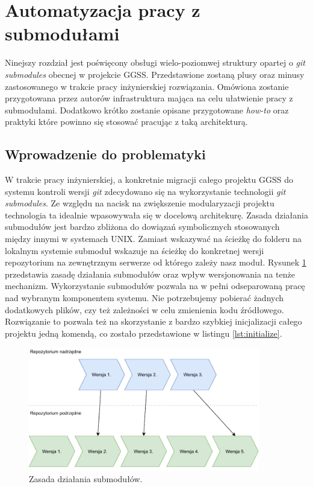 \clearpage
\section{Automatyzacja pracy z submodułami}
\label{sec:gitio}

Ninejszy rozdział jest poświęcony obsługi wielo-poziomwej struktury opartej o \emph{git submodules} obecnej w projekcie GGSS. Przedstawione zostaną plusy oraz minusy zastosowanego w trakcie pracy inżynierskiej rozwiązania. Omówiona zostanie przygotowana przez autorów infrastruktura mająca na celu ułatwienie pracy z submodułami. Dodatkowo krótko zostanie opisane przygotowane \emph{how-to} oraz praktyki które powinno się stosować pracując z taką architekturą.

\subsection{Wprowadzenie do problematyki}

W trakcie pracy inżynierskiej, a konkretnie migracji całego projektu GGSS do systemu kontroli wersji \emph{git} zdecydowano się na wykorzystanie technologii \emph{git submodules}. Ze względu na nacisk na zwiększenie modularyzacji projektu technologia ta idealnie wpasowywała się w docelową architekurę. Zasada działania submodułów jest bardzo zbliżona do dowiązań symbolicznych stosowanych między innymi w systemach UNIX. Zamiast wskazywać na ścieżkę do folderu na lokalnym systemie submoduł wskazuje na ścieżkę do konkretnej wersji repozytorium na zewnętrznym serwerze od którego zależy nasz moduł. Rysunek \ref{fig:submodules_links} przedstawia zasadę działania submodułów oraz wpływ wersjonowania na tenże mechanizm. Wykorzystanie submodułów pozwala na w pełni odseparowaną pracę nad wybranym komponentem systemu. Nie potrzebujemy pobierać żadnych dodatkowych plików, czy też zależności w celu zmienienia kodu źródłowego. Rozwiązanie to pozwala też na skorzystanie z bardzo szybkiej inicjalizacji całego projektu jedną komendą, co zostało przedstawione w listingu \ref{lst:initialize}.

\begin{figure}[H]
    \centering
    \includegraphics[width=0.9\textwidth]{components/infra/gitio_submodules_res/submodule_links}
    \caption{Zasada działania submodułów.}
    \label{fig:submodules_links}
\end{figure}

